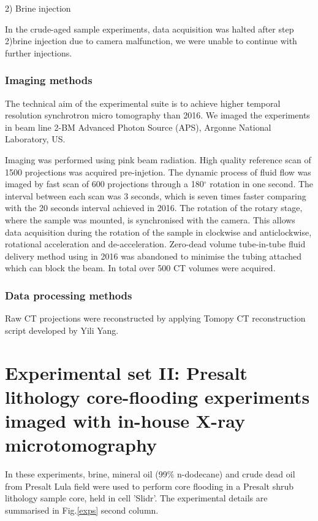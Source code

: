 2) Brine injection

In the crude-aged sample experiments, data acquisition was halted after step 2)brine injection due to camera malfunction, we were unable to continue with further injections.


\subsubsection{Imaging methods}
The technical aim of the experimental suite is to achieve higher temporal resolution synchrotron micro tomography than 2016. We imaged the experiments in beam line 2-BM Advanced Photon Source (APS), Argonne National Laboratory, US. 

Imaging was performed using pink beam radiation. High quality reference scan of 1500 projections was acquired pre-injetion. The dynamic process of fluid flow was imaged by fast scan of 600 projections through a 180$^{\circ}$ rotation in one second. The interval between each scan was 3 seconds, which is seven times faster comparing with the 20 seconds interval achieved in 2016.  The rotation of the rotary stage, where the sample was mounted, is synchronised with the camera. This allows data acquisition during the rotation of the sample in clockwise and anticlockwise, rotational acceleration and de-acceleration. Zero-dead volume tube-in-tube fluid delivery method using in 2016 was abandoned to minimise the tubing attached which can block the beam. In total over 500 \textmu CT volumes were acquired. 

\subsubsection{Data processing methods}
Raw CT projections were reconstructed by applying Tomopy CT reconstruction script developed by Yili Yang.

\section{Experimental set II: Presalt lithology core-flooding experiments imaged with in-house X-ray microtomography}

In these experiments, brine, mineral oil (99\% n-dodecane) and crude dead oil from Presalt Lula field were used to perform core flooding in a Presalt shrub lithology sample core, held in cell 'Slidr'. The experimental details are summarised in Fig.\ref{exps} second column.


